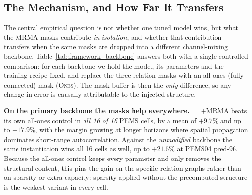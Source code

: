 
\subsection{The Mechanism, and How Far It Transfers}
\label{sec:frameworkresults}

The central empirical question is not whether one tuned model wins, but what the
MRMA masks contribute \emph{in isolation}, and whether that contribution
transfers when the same masks are dropped into a different channel-mixing
backbone. Table~\ref{tab:framework_backbone} answers both with a single controlled
comparison: for each backbone we hold the model, its parameters and the training
recipe fixed, and replace the three relation masks with an all-ones
(fully-connected) mask (\textsc{Ones}). The mask buffer is then the \emph{only}
difference, so any change in error is causally attributable to the injected
structure.

\textbf{On the primary backbone the masks help everywhere.}
\mr{}${=}$\itrans{}${+}$MRMA beats its own all-ones control in \emph{all 16 of 16}
PEMS cells, by a mean of $+9.7\%$ and up to $+17.9\%$, with the margin growing at
longer horizons where spatial propagation dominates short-range autocorrelation.
Against the \emph{unmodified} \itrans{} backbone the same instantiation wins all
16 cells as well, up to $+21.5\%$ at PEMS04 pred-96. Because the all-ones control
keeps every parameter and only removes the structural content, this pins the gain
on the specific relation graphs rather than on sparsity or extra capacity:
sparsity applied without the precomputed structure is the weakest variant in
every cell.

